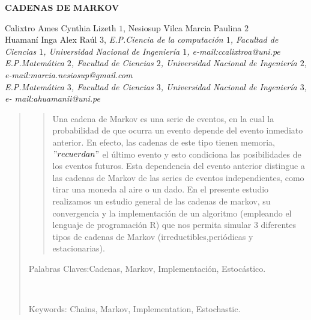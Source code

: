 \documentclass[10pt,a4paper]{article}
\theoremstyle{definition}
\theoremstyle{remark}
\begin{document}
\begin{center}
 {\Large \textbf{CADENAS DE MARKOV}}
\end{center}
\begin{center}
Calixtro Ames Cynthia Lizeth $1$, Nesiosup Vilca Marcia Paulina $2$\\
Huamaní Inga Alex Raúl $3$, \vskip12pt
{\it E.P.Ciencia de la computación $1$, Facultad de Ciencias $1$, Universidad Nacional de Ingeniería $1$, e-mail:ccalixtroa@uni.pe \\E.P.Matemática $2$, Facultad de Ciencias $2$, Universidad Nacional de Ingeniería $2$, e-mail:marcia.nesiosup@gmail.com \\ E.P.Matemática $3$, Facultad de Ciencias $3$, Universidad Nacional de Ingeniería $3$, e-
mail:ahuamanii@uni.pe}
\end{center}
\begin{quotation}
{\small
\begin{abstract}
\noindent  Una cadena de Markov es una serie de eventos, en la cual la probabilidad de que ocurra un evento depende del evento inmediato anterior. En efecto, las cadenas de este tipo tienen memoria, $"recuerdan"$ el último evento y esto condiciona las posibilidades de los eventos futuros. Esta dependencia del evento anterior distingue a las cadenas de Markov de las series de eventos independientes, como tirar una moneda al aire o un dado. En el presente estudio realizamos un estudio general de las cadenas de markov, su convergencia y la implementación de un algoritmo (empleando el lenguaje de programación R) que nos permita simular 3 diferentes tipos de cadenas de Markov (irreductibles,periódicas y estacionarias).

\end{abstract}
\hspace*{0.5cm} Palabras Claves:Cadenas, Markov, Implementación, Estocástico.  
}\\
{\small
\hspace*{0.5cm} 

Keywords: Chains, Markov, Implementation, Estochastic. \\ 
}
\end{quotation}
\end{document}
